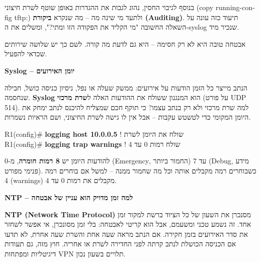 \documentclass[11pt]{article}
\newcommand{\enLR}[1]{\textenglish{#1}}
\newcommand{\code}[1]{\textenglish{\codefont #1}}
\newcommand{\sectionheading}[1]{\vskip10pt\penalty-200{\large\bfseries\color{h2}#1\par}\vskip3pt}
\newcommand{\subheading}[1]{\vskip6pt{\bfseries\color{h3}#1\par}\vskip2pt}
\begin{document}
בנוסף לגיבוי החסין, נהוג לגבות את ההגדרות באופן שוטף לשרת חיצוני (\code{copy running-config tftp:}) ולתעד מי שינה מה – מה שנקרא \textbf{ביקורת \enLR{(Auditing)}}. תיעוד כזה עונה על השאלה החשובה "מי הקליד את הפקודה הזו ומתי?", ומשלים את ה-\enLR{syslog} שנכיר מיד.\par

\sectionheading{\enLR{2.6} ניטור: לדעת מה קורה בנתב}

אבטחה טובה היא לא רק חסימה – היא גם לדעת מה קורה. לשם כך יש שלושה שירותים שכדאי להפעיל.\par

\subheading{\enLR{Syslog} – יומן האירועים}

הנתב מייצר כל הזמן הודעות על אירועים: ממשק שעלה או נפל, ניסיון כניסה כושל, חבילה שנחסמה. \textbf{\enLR{Syslog}} הוא המנגנון ששולח את ההודעות האלה ל\textbf{שרת מרכזי} (על פורט \enLR{UDP 514).} למה שרת מרכזי ולא רק בנתב עצמו? כי תוקף חכם שמצליח להיכנס לנתב ימחק את היומן המקומי כדי לטשטש עקבות – אבל אין לו גישה לשרת החיצוני, ושם הראיות נשמרות.\par

\begin{codebox}\begin{english}\codefont\footnotesize\color{cfg}\setlength{\parindent}{0pt}
R1(config)\# \textcolor{cbold}{\textbf{logging host 10.0.0.5}}       \textcolor{ccom}{\texthebrew{! שולח את היומן לשרת}}\\
R1(config)\# \textcolor{cbold}{\textbf{logging trap warnings}}       \textcolor{ccom}{\texthebrew{! שולח רמות \enLR{0} עד \enLR{4}}}
\end{english}\end{codebox}

להודעות היומן יש \textbf{\enLR{8} רמות חומרה}, מ-\enLR{0 (Emergency}, החמור ביותר) עד \enLR{7 (Debug}, מידע פנימי מפורט). כשבוחרים רמה מקבלים אותה וכל מה שחמור ממנה – למשל אם בוחרים רמה \enLR{4 (warnings)} מקבלים את רמות \enLR{0} עד \enLR{4.}\par

\subheading{\enLR{NTP} – למה זמן מדויק הוא עניין של אבטחה}

\textbf{\enLR{NTP (Network Time Protocol)}} מסנכרן את השעון של כל הציוד ברשת למקור זמן אחד. זה נשמע טכני ומשעמם, אבל הוא קריטי לאבטחה: בלי זמן מסונכרן, אי אפשר לשחזר את סדר האירועים בזמן חקירה. אם הנתב מראה שעה אחת והשרת שעה אחרת, לא תדעו אם הכניסה הכושלת לנתב קרתה לפני החדירה לשרת או אחריה. חוץ מזה, גם תעודות דיגיטליות ומפתחות \enLR{VPN} תלויים בשעון נכון.\par
\end{document}
